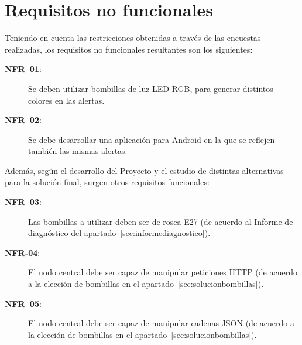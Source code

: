\clearpage
\section{Requisitos no funcionales}

Teniendo en cuenta las restricciones obtenidas a través de las encuestas realizadas, los requisitos no funcionales resultantes son los siguientes:

\begin{description}
    \item[\textbf{NFR–01}:] Se deben utilizar bombillas de luz LED RGB, para generar distintos colores en las alertas.
    \item[\textbf{NFR–02}:] Se debe desarrollar una aplicación para Android en la que se reflejen también las mismas alertas.
\end{description}

Además, según el desarrollo del Proyecto y el estudio de distintas alternativas para la solución final, surgen otros requisitos funcionales:

\begin{description}
    \item[\textbf{NFR–03}:] Las bombillas a utilizar deben ser de rosca E27 (de acuerdo al Informe de diagnóstico del apartado~\ref{sec:informediagnostico}).
    \item[\textbf{NFR-04}:] El nodo central debe ser capaz de manipular peticiones HTTP (de acuerdo a la elección de bombillas en el apartado~\ref{sec:solucionbombillas}).
    \item[\textbf{NFR–05}:] El nodo central debe ser capaz de manipular cadenas JSON (de acuerdo a la elección de bombillas en el apartado~\ref{sec:solucionbombillas}).
\end{description}